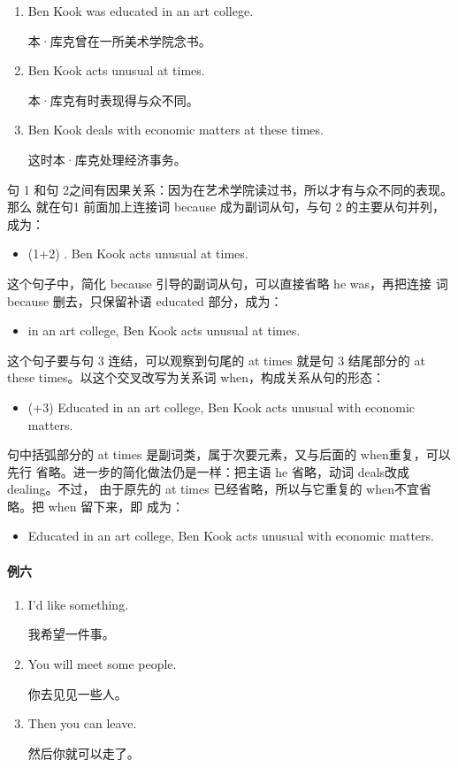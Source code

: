 \begin{enumerate}
\item Ben Kook was educated in an art college.

  本·库克曾在一所美术学院念书。
\item Ben Kook acts unusual at times.

  本·库克有时表现得与众不同。
\item Ben Kook deals with economic matters at these times.

  这时本·库克处理经济事务。
\end{enumerate}

句 1 和句 2之间有因果关系：因为在艺术学院读过书，所以才有与众不同的表现。那么
就在句1 前面加上连接词 because 成为副词从句，与句 2 的主要从句并列，成为：
\begin{itemize}
\item (1+2) . Ben Kook acts unusual at
  times.
\end{itemize}
这个句子中，简化 because 引导的副词从句，可以直接省略 he was，再把连接
词because 删去，只保留补语 educated 部分，成为：
\begin{itemize}
\item {} in an art college, Ben Kook acts unusual at times.
\end{itemize}
这个句子要与句 3 连结，可以观察到句尾的 at times 就是句 3 结尾部分的 at
these times。以这个交叉改写为关系词 when，构成关系从句的形态：
\begin{itemize}
\item (+3) Educated in an art college, Ben Kook acts unusual  with economic matters.
\end{itemize}
句中括弧部分的 at times 是副词类，属于次要元素，又与后面的 when重复，可以先行
省略。进一步的简化做法仍是一样：把主语 he 省略，动词 deals改成 dealing。不过，
由于原先的 at times 已经省略，所以与它重复的 when不宜省略。把 when 留下来，即
成为：

\begin{itemize}
\item Educated in an art college, Ben Kook acts unusual  with
  economic matters.
\end{itemize}

\paragraph{例六}

\begin{enumerate}
\item   I'd like something.

  我希望一件事。
\item   You will meet some people.

  你去见见一些人。
\item   Then you can leave.

  然后你就可以走了。
\end{enumerate}

